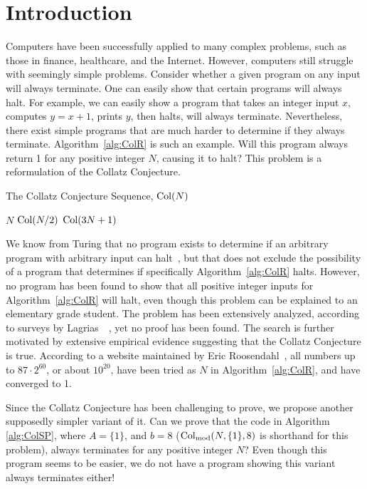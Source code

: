 \chapter{Introduction} \label{sec:introduction}
Computers have been successfully applied to many complex problems, such as those in finance, healthcare, and the Internet. However, computers still struggle with seemingly simple problems. Consider whether a given program on any input will always terminate. One can easily show that certain programs will always halt. For example, we can easily show a program that takes an integer input $x$, computes $y=x+1$, prints $y$, then halts, will always terminate. Nevertheless, there exist simple programs that are much harder to determine if they always terminate. Algorithm~\ref{alg:ColR} is such an example. Will this program always return 1 for any positive integer $N$, causing it to halt? This problem is a reformulation of the Collatz Conjecture. \par
\begin{algorithm} 
\caption{The Collatz Conjecture Sequence, $\mathrm{Col}(N)$}
\label{alg:ColR} 
\begin{algorithmic}[1]
     \Return $N$ 
    \EndIf
     \Return $\mathrm{Col}(N/2)$
    \EndIf
    \State \Return $\mathrm{Col}(3N + 1)$ 
\end{algorithmic}
\end{algorithm}
We know from Turing that no program exists to determine if an arbitrary program with arbitrary input can halt~\cite{Turing1936}, but that does not exclude the possibility of a program that determines if specifically Algorithm~\ref{alg:ColR} halts. However, no program has been found to show that all positive integer inputs for Algorithm~\ref{alg:ColR} will halt, even though this problem can be explained to an elementary grade student. The problem has been extensively analyzed, according to surveys by Lagrias~\cite{2003mathLagrais}~\cite{2006mathLagrias}, yet no proof has been found. The search is further motivated by extensive empirical evidence suggesting that the Collatz Conjecture is true. According to a website maintained by Eric Roosendahl~\cite{EricRoose}, all numbers up to $87 \cdot 2^{60}$, or about $10^{20}$, have been tried as $N$ in Algorithm~\ref{alg:ColR}, and have converged to 1. \par
Since the Collatz Conjecture has been challenging to prove, we propose another supposedly simpler variant of it. Can we prove that the code in Algorithm \ref{alg:ColSP}, where $A = \{1\}$, and $b = 8$ ($\mathrm{Col}_{\text{mod}}(N,\{1\},8)$ is shorthand for this problem), always terminates for any positive integer $N$? Even though this program seems to be easier, we do not have a program showing this variant always terminates either! \par
